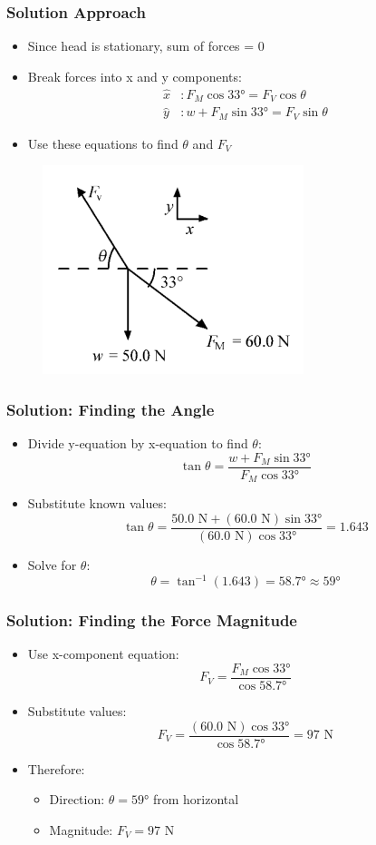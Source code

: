 \documentclass{beamer}
\begin{document}
\begin{frame}
\frametitle{Solution Approach}
\begin{itemize}
    \item Since head is stationary, sum of forces = 0
    \item Break forces into x and y components:
    \begin{align*}
    \hat{x}&: F_M \cos 33° = F_V \cos \theta\\
    \hat{y}&: w + F_M \sin 33° = F_V \sin \theta
    \end{align*}
    \item Use these equations to find $\theta$ and $F_V$
\end{itemize}
\begin{figure}
    \centering
    \includegraphics[width=0.5\linewidth]{CH9.5 4,5,9 Review/Screenshot 2024-11-12 103435.png}
\end{figure}

\end{frame}

\begin{frame}
\frametitle{Solution: Finding the Angle}
\begin{itemize}
    \item Divide y-equation by x-equation to find $\theta$:
    \[\tan \theta = \frac{w + F_M \sin 33°}{F_M \cos 33°}\]
    \item Substitute known values:
    \[\tan \theta = \frac{50.0\text{ N} + (60.0\text{ N})\sin 33°}{(60.0\text{ N})\cos 33°} = 1.643\]
    \item Solve for $\theta$:
    \[\theta = \tan^{-1}(1.643) = 58.7° \approx 59°\]
\end{itemize}
\end{frame}

\begin{frame}
\frametitle{Solution: Finding the Force Magnitude}
\begin{itemize}
    \item Use x-component equation:
    \[F_V = \frac{F_M \cos 33°}{\cos 58.7°}\]
    \item Substitute values:
    \[F_V = \frac{(60.0\text{ N})\cos 33°}{\cos 58.7°} = 97\text{ N}\]
    \item Therefore:
    \begin{itemize}
        \item Direction: $\theta = 59°$ from horizontal
        \item Magnitude: $F_V = 97$ N
    \end{itemize}
\end{itemize}
\end{frame}
\end{document}
